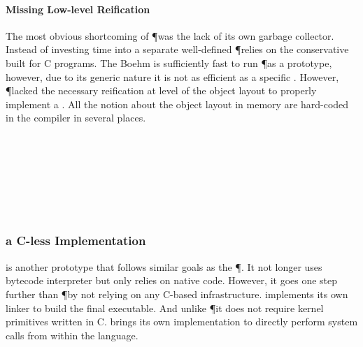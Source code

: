 \paragraph{Missing Low-level Reification}
The most obvious shortcoming of \P was the lack of its own garbage collector.
Instead of investing time into a separate well-defined \GC \P relies on the conservative  built for C programs.
The Boehm \GC is sufficiently fast to run \P as a prototype, however, due to its generic nature it is not as efficient as a specific \GC.
However, \P lacked the necessary reification at level of the object layout to properly implement a \GC.
All the notion about the object layout in memory are hard-coded in the compiler in several places.

 \\
 \\
 \\
 \\
 \\
 \\

\subsubsection*{\MIST a C-less \ST Implementation}
 is another prototype \ST \VM that follows similar goals as the \P \VM.
It not longer uses bytecode interpreter but only relies on native code.
However, it goes one step further than \P by not relying on any C-based infrastructure.
\MIST implements its own linker to build the final executable.
And unlike \P it does not require kernel primitives written in C.
\MIST brings its own implementation to directly perform system calls from within the language.

\subsubsection*{\DwarfPython}

